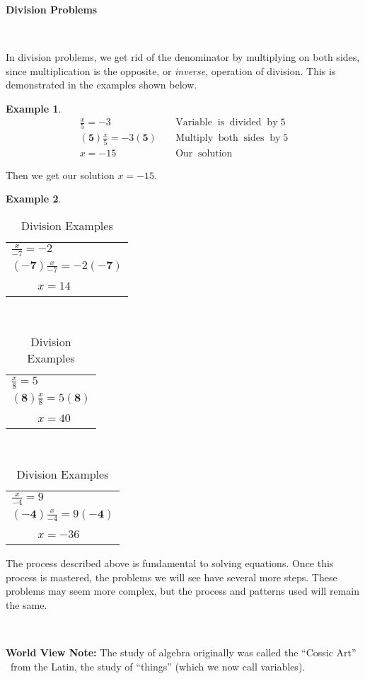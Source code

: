 \documentclass[11pt]{book}
\newcommand{\tmmathbf}[1]{\ensuremath{\boldsymbol{#1}}}
\newcommand{\tmop}[1]{\ensuremath{\operatorname{#1}}}
\theoremstyle{definition}  %
\newtheorem{example}{Example}[chapter]
\newcommand{\pp}{\par~\par}
\begin{document}
{\textbf{Division Problems}}\par
~\par
In division problems, we get rid of the denominator by multiplying on both
sides, since multiplication is the opposite, or \textit{inverse}, operation of division. This is demonstrated in the examples shown below.

\begin{example}\label{Lin11}
  \begin{eqnarray*}
    \frac{x}{5} = - 3 &  & \tmop{Variable} \tmop{is} \tmop{divided} \tmop{by}
    5\\
    \tmmathbf{(5)} \frac{x}{5} = - 3 \tmmathbf{(5)} &  & \tmop{Multiply}
    \tmop{both} \tmop{sides} \tmop{by} 5\\
    x = - 15 &  & \tmop{Our} \tmop{solution}
  \end{eqnarray*}
\end{example}

Then we get our solution $x = - 15$. %

\pagebreak

\begin{example}\label{Lin12}
~\end{example}

\begin{table}[h]
  \begin{tabular}{l}
    $ \frac{x}{- 7} = - 2$\\
    $\tmmathbf{(-7)}\frac{x}{- 7} = - 2\tmmathbf{(-7)}$\\
    ~~~~ $x = 14$
  \end{tabular} \ \ \ \ \ \ \ \ \ \ \ \ \ \ \begin{tabular}{l}
    $ \frac{x}{8} = 5$\\
    $\tmmathbf{(8)} \frac{x}{8} = 5 \tmmathbf{(8)}$\\
    ~~~~ $x = 40$
  \end{tabular} \ \ \ \ \ \ \ \ \ \ \ \ \ \ \begin{tabular}{l}
    $ \frac{x}{- 4} = 9$\\
    $\tmmathbf{(-4)}\frac{x}{- 4} = 9\tmmathbf{(-4)}$\\
    ~~~~ $x = - 36$
  \end{tabular}
  \caption{Division Examples}
\end{table}

The process described above is fundamental to solving equations. Once this
process is mastered, the problems we will see have several more steps. These
problems may seem more complex, but the process and patterns used will remain
the same.\pp
{\textbf{World View Note: }}The study of algebra originally was called the
``Cossic Art'' \ from the Latin, the study of ``things'' (which we now call
variables).
\end{document}
